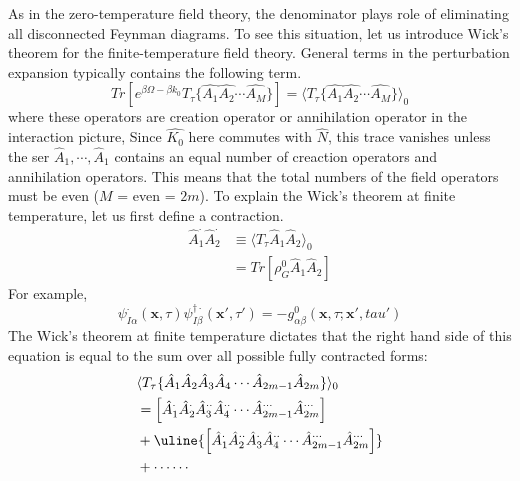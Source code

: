 As in the zero-temperature field theory, the denominator plays role of eliminating all disconnected Feynman diagrams.
To see this situation, let us introduce Wick's theorem for the finite-temperature field theory.
General terms in the perturbation expansion typically contains the following term.
\begin{equation}
Tr\left[e^{\beta\Omega-\beta k_0}T_\tau\{\hat{A_1}\hat{A_2}\cdots\hat{A_M}\}\right]=\langle T_\tau\{\hat{A_1}\hat{A_2}\cdots\hat{A_M}\}\rangle_0
\end{equation}
where these operators are creation operator or annihilation operator in the interaction picture,
Since $\hat{K_0}$ here commutes with $\hat{N}$, this trace vanishes unless the ser $\hat{A}_1,\cdots,\hat{A}_1$ contains an equal number of creaction operators and annihilation operators.
This means that the total numbers of the field operators must be even ($M$ = even = $2m$).
To explain the Wick's theorem at finite temperature, let us first define a contraction.
\begin{equation}\label{4.3.A}
\begin{aligned}
\hat{A}_{1}^\cdotp \hat{A}_{2}^\cdot & \equiv \langle T_{\tau} \hat{A}_{1} \hat{A}_{2} \rangle_{0}\\
&=Tr[\rho_G^0\hat{A}_1\hat{A}_2]
\end{aligned}
\end{equation}
For example,
\begin{equation}
\psi_{I\alpha}^{\cdotp}(\mathbf{x},\tau) \psi_{I\beta}^{\dagger\cdotp}(\mathbf{x'},\tau')=-g_{\alpha\beta}^0(\mathbf{x},\tau;\mathbf{x'},tau')
\end{equation}
The Wick's theorem at finite temperature dictates that the right hand side of this equation is equal to the sum over all possible fully contracted forms:
\begin{equation}
\begin{aligned}
&\langle T_\tau\{ \hat{A}_1\hat{A}_2\hat{A}_3\hat{A}_4\cdots \hat{A}_{2m-1}\hat{A}_{2m}\}\rangle_0\\
&=\left[\hat{A}_1^{\cdot} \hat{A}_2^{\cdot} \hat{A}_3^{\cdot\cdot} \hat{A}_4^{\cdot\cdot} \cdots \hat{A}_{2m-1}^{\cdots} \hat{A}_{2m}^{\cdots} \right]\\
&+\uline{\left[\hat{A}_1^\cdot\hat{A}_2^{\cdot\cdot}\hat{A}_3^\cdot\hat{A}_4^{\cdot\cdot}\cdots\hat{A}_{2m-1}^{\cdots}\hat{A}_{2m}^{\cdots}\right]}\\
&+\cdots\cdots
\end{aligned}
\end{equation}
